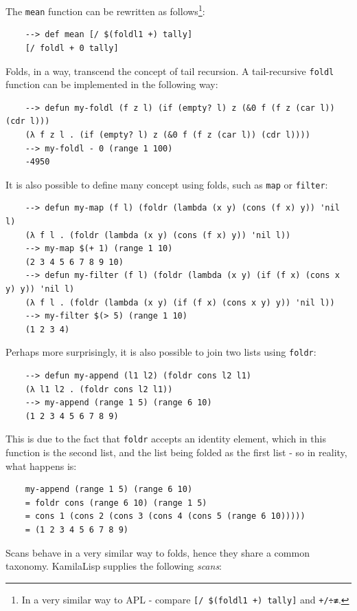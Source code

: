 The \verb|mean| function can be rewritten as follows\footnote{In a very similar way to APL - compare \verb|[/ $(foldl1 +) tally]| and \verb|+/÷≢|.}:

\begin{Verbatim}
    --> def mean [/ $(foldl1 +) tally]
    [/ foldl + 0 tally]
\end{Verbatim}

Folds, in a way, transcend the concept of tail recursion. A tail-recursive \verb|foldl| function can be implemented in the following way:

\begin{Verbatim}
    --> defun my-foldl (f z l) (if (empty? l) z (&0 f (f z (car l)) (cdr l)))
    (λ f z l . (if (empty? l) z (&0 f (f z (car l)) (cdr l))))
    --> my-foldl - 0 (range 1 100)
    -4950
\end{Verbatim}

It is also possible to define many concept using folds, such as \verb|map| or \verb|filter|:

\begin{Verbatim}
    --> defun my-map (f l) (foldr (lambda (x y) (cons (f x) y)) 'nil l)
    (λ f l . (foldr (lambda (x y) (cons (f x) y)) 'nil l))
    --> my-map $(+ 1) (range 1 10)
    (2 3 4 5 6 7 8 9 10)
    --> defun my-filter (f l) (foldr (lambda (x y) (if (f x) (cons x y) y)) 'nil l)
    (λ f l . (foldr (lambda (x y) (if (f x) (cons x y) y)) 'nil l))
    --> my-filter $(> 5) (range 1 10)
    (1 2 3 4)
\end{Verbatim}

Perhaps more surprisingly, it is also possible to join two lists using \verb|foldr|:

\begin{Verbatim}
    --> defun my-append (l1 l2) (foldr cons l2 l1)
    (λ l1 l2 . (foldr cons l2 l1))
    --> my-append (range 1 5) (range 6 10)
    (1 2 3 4 5 6 7 8 9)
\end{Verbatim}

This is due to the fact that \verb|foldr| accepts an identity element, which in this function is the second list, and the list being folded as the first list - so in reality, what happens is:

\begin{Verbatim}
    my-append (range 1 5) (range 6 10)
    = foldr cons (range 6 10) (range 1 5)
    = cons 1 (cons 2 (cons 3 (cons 4 (cons 5 (range 6 10)))))
    = (1 2 3 4 5 6 7 8 9)
\end{Verbatim}

Scans behave in a very similar way to folds, hence they share a common taxonomy. KamilaLisp supplies the following \textit{scans}:

